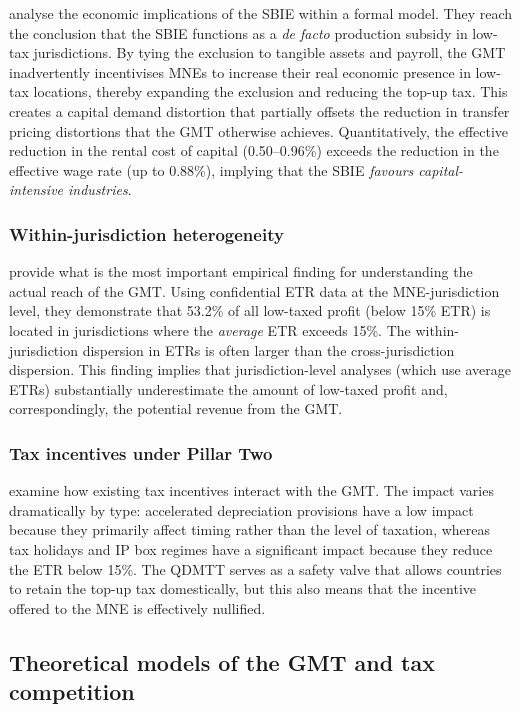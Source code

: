 \documentclass[11pt,a4paper]{article}
\begin{document}
\citet{schjelderup2024} analyse the economic implications of the SBIE within a formal model. They reach the conclusion that the SBIE functions as a \emph{de facto} production subsidy in low-tax jurisdictions. By tying the exclusion to tangible assets and payroll, the GMT inadvertently incentivises MNEs to increase their real economic presence in low-tax locations, thereby expanding the exclusion and reducing the top-up tax. This creates a capital demand distortion that partially offsets the reduction in transfer pricing distortions that the GMT otherwise achieves. Quantitatively, the effective reduction in the rental cost of capital (0.50--0.96\%) exceeds the reduction in the effective wage rate (up to 0.88\%), implying that the SBIE \emph{favours capital-intensive industries}.

\subsubsection{Within-jurisdiction heterogeneity}

\citet{hugger2026} provide what is the most important empirical finding for understanding the actual reach of the GMT. Using confidential ETR data at the MNE-jurisdiction level, they demonstrate that 53.2\% of all low-taxed profit (below 15\% ETR) is located in jurisdictions where the \textit{average} ETR exceeds 15\%. The within-jurisdiction dispersion in ETRs is often larger than the cross-jurisdiction dispersion. This finding implies that jurisdiction-level analyses (which use average ETRs) substantially underestimate the amount of low-taxed profit and, correspondingly, the potential revenue from the GMT.

\subsubsection{Tax incentives under Pillar Two}

\citet{ferreiraliotti2022} examine how existing tax incentives interact with the GMT. The impact varies dramatically by type: accelerated depreciation provisions have a low impact because they primarily affect timing rather than the level of taxation, whereas tax holidays and IP box regimes have a significant impact because they reduce the ETR below 15\%. The QDMTT serves as a safety valve that allows countries to retain the top-up tax domestically, but this also means that the incentive offered to the MNE is effectively nullified.

\subsection{Theoretical models of the GMT and tax competition}\label{sec:theory_lit}
\end{document}
